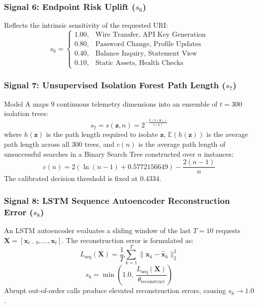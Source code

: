 \documentclass[conference]{IEEEtran}
\begin{document}
\subsubsection{Signal 6: Endpoint Risk Uplift ($s_6$)}
Reflects the intrinsic sensitivity of the requested URI:
\begin{equation}
s_6 = \begin{cases}
1.00, & \text{Wire Transfer, API Key Generation} \\
0.80, & \text{Password Change, Profile Updates} \\
0.40, & \text{Balance Inquiry, Statement View} \\
0.10, & \text{Static Assets, Health Checks}
\end{cases}
\label{eq:sig6}
\end{equation}

\subsubsection{Signal 7: Unsupervised Isolation Forest Path Length ($s_7$)}
Model A maps 9 continuous telemetry dimensions into an ensemble of $t = 300$ isolation trees:
\begin{equation}
s_7 = s(\mathbf{z}, n) = 2^{-\frac{\mathbb{E}(h(\mathbf{z}))}{c(n)}}
\label{eq:sig7}
\end{equation}
where $h(\mathbf{z})$ is the path length required to isolate $\mathbf{z}$, $\mathbb{E}(h(\mathbf{z}))$ is the average path length across all 300 trees, and $c(n)$ is the average path length of unsuccessful searches in a Binary Search Tree constructed over $n$ instances:
\begin{equation}
c(n) = 2\left(\ln(n - 1) + 0.5772156649\right) - \frac{2(n - 1)}{n}
\label{eq:sig7_c}
\end{equation}
The calibrated decision threshold is fixed at $0.4334$.

\subsubsection{Signal 8: LSTM Sequence Autoencoder Reconstruction Error ($s_8$)}
An LSTM autoencoder evaluates a sliding window of the last $T = 10$ requests $\mathbf{X} = [\mathbf{x}_{t-9}, \dots, \mathbf{x}_t]$. The reconstruction error is formulated as:
\begin{equation}
L_{\text{seq}}(\mathbf{X}) = \frac{1}{T} \sum_{k=1}^T \|\mathbf{x}_k - \hat{\mathbf{x}}_k\|_2^2
\label{eq:sig8_loss}
\end{equation}
\begin{equation}
s_8 = \min\left(1.0, ~ \frac{L_{\text{seq}}(\mathbf{X})}{\theta_{\text{reconstruct}}}\right)
\label{eq:sig8_score}
\end{equation}
Abrupt out-of-order calls produce elevated reconstruction errors, causing $s_8 \to 1.0$.
\end{document}
